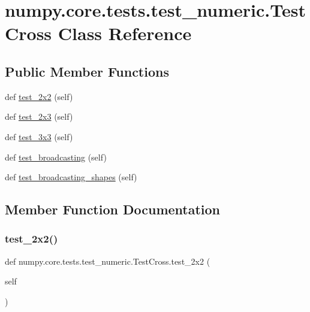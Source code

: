 \hypertarget{classnumpy_1_1core_1_1tests_1_1test__numeric_1_1TestCross}{}\section{numpy.\+core.\+tests.\+test\+\_\+numeric.\+Test\+Cross Class Reference}
\label{classnumpy_1_1core_1_1tests_1_1test__numeric_1_1TestCross}
\subsection*{Public Member Functions}
\begin{DoxyCompactItemize}
\item 
def \hyperlink{classnumpy_1_1core_1_1tests_1_1test__numeric_1_1TestCross_aa526a1d61f89477d3c9ee7b432a61a86}{test\+\_\+2x2} (self)
\item 
def \hyperlink{classnumpy_1_1core_1_1tests_1_1test__numeric_1_1TestCross_a219f094fea2fddd976914746ddb618b1}{test\+\_\+2x3} (self)
\item 
def \hyperlink{classnumpy_1_1core_1_1tests_1_1test__numeric_1_1TestCross_a250bb9f91de574cc28c745c4f8e42db1}{test\+\_\+3x3} (self)
\item 
def \hyperlink{classnumpy_1_1core_1_1tests_1_1test__numeric_1_1TestCross_ab0991f9d1c5a7e90ced5bdd06d929ca1}{test\+\_\+broadcasting} (self)
\item 
def \hyperlink{classnumpy_1_1core_1_1tests_1_1test__numeric_1_1TestCross_a080067ec06c94133a99e5b40591dc66a}{test\+\_\+broadcasting\+\_\+shapes} (self)
\end{DoxyCompactItemize}


\subsection{Member Function Documentation}
\mbox{\label{classnumpy_1_1core_1_1tests_1_1test__numeric_1_1TestCross_aa526a1d61f89477d3c9ee7b432a61a86}} 
\subsubsection{\texorpdfstring{test\+\_\+2x2()}{test\_2x2()}}
{\footnotesize\ttfamily def numpy.\+core.\+tests.\+test\+\_\+numeric.\+Test\+Cross.\+test\+\_\+2x2 (\begin{DoxyParamCaption}\item[{}]{self }\end{DoxyParamCaption})}

